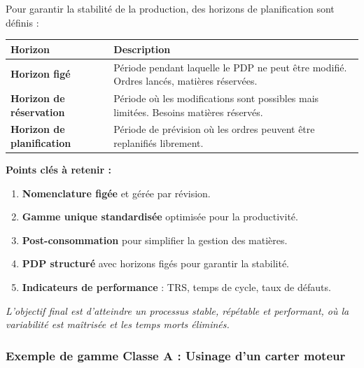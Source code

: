 \documentclass{article}
\begin{document}
Pour garantir la stabilité de la production, des horizons de planification sont définis :

\begin{tabular}{|p{}|p{}|}
\hline
\textbf{Horizon} & \textbf{Description} \\
\hline
\textbf{Horizon figé} & Période pendant laquelle le PDP ne peut être modifié. Ordres lancés, matières réservées. \\
\hline
\textbf{Horizon de réservation} & Période où les modifications sont possibles mais limitées. Besoins matières réservés. \\
\hline
\textbf{Horizon de planification} & Période de prévision où les ordres peuvent être replanifiés librement. \\
\hline
\end{tabular}

\begin{tcolorbox}[colback=green!5!white, colframe=green!50!black, title=Synthèse : Définition des Gammes pour la Classe A]
\textbf{Points clés à retenir :}
\begin{enumerate}
    \item \textbf{Nomenclature figée} et gérée par révision.
    \item \textbf{Gamme unique standardisée} optimisée pour la productivité.
    \item \textbf{Post-consommation} pour simplifier la gestion des matières.
    \item \textbf{PDP structuré} avec horizons figés pour garantir la stabilité.
    \item \textbf{Indicateurs de performance} : TRS, temps de cycle, taux de défauts.
\end{enumerate}
\vspace{0.5em}
\textit{L'objectif final est d'atteindre un processus stable, répétable et performant, où la variabilité est maîtrisée et les temps morts éliminés.}
\end{tcolorbox}

\subsubsection{Exemple de gamme Classe A : Usinage d'un carter moteur}
\end{document}
